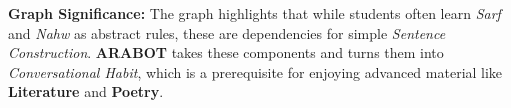 \documentclass{article}
\begin{document}
\noindent \textbf{Graph Significance:} The graph highlights that while students often learn \textit{Sarf} and \textit{Nahw} as abstract rules, these are dependencies for simple \textit{Sentence Construction}. \textbf{ARABOT} takes these components and turns them into \textit{Conversational Habit}, which is a prerequisite for enjoying advanced material like \textbf{Literature} and \textbf{Poetry}.
\end{document}
